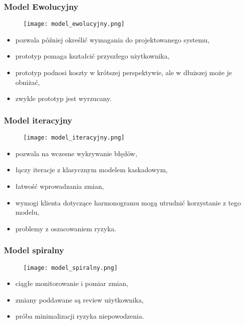 \documentclass[a4paper]{article}
\begin{document}
    \subsubsection{Model Ewolucyjny}
    \begin{figure}[H]
        \texttt{[image: model\_ewolucyjny.png]}
    \end{figure}
    \begin{itemize}
        \item pozwala później określić wymagania do projektowanego systemu,
        \item prototyp pomaga kształcić przyszłego użytkownika,
        \item prototyp podnosi koszty w krótszej perspektywie, ale w
        dłuższej może je obniżać,
        \item zwykle prototyp jest wyrzucany.
    \end{itemize}

    \subsubsection{Model iteracyjny}
    \begin{figure}[H]
        \texttt{[image: model\_iteracyjny.png]}
    \end{figure}
    \begin{itemize}
        \item pozwala na wczesne wykrywanie błędów,
        \item łączy iteracje z klasycznym modelem kaskadowym,
        \item łatwość wprowadzania zmian,
        \item wymogi klienta dotyczące harmonogramu mogą utrudnić korzystanie z tego
        modelu,
        \item problemy z oszacowaniem ryzyka.
    \end{itemize}

    \subsubsection{Model spiralny}
    \begin{figure}[H]
        \texttt{[image: model\_spiralny.png]}
    \end{figure}
    \begin{itemize}
        \item ciągłe monitorowanie i pomiar zmian,
        \item zmiany poddawane są review użytkownika,
        \item próba minimalizacji ryzyka niepowodzenia.
    \end{itemize}
\end{document}
